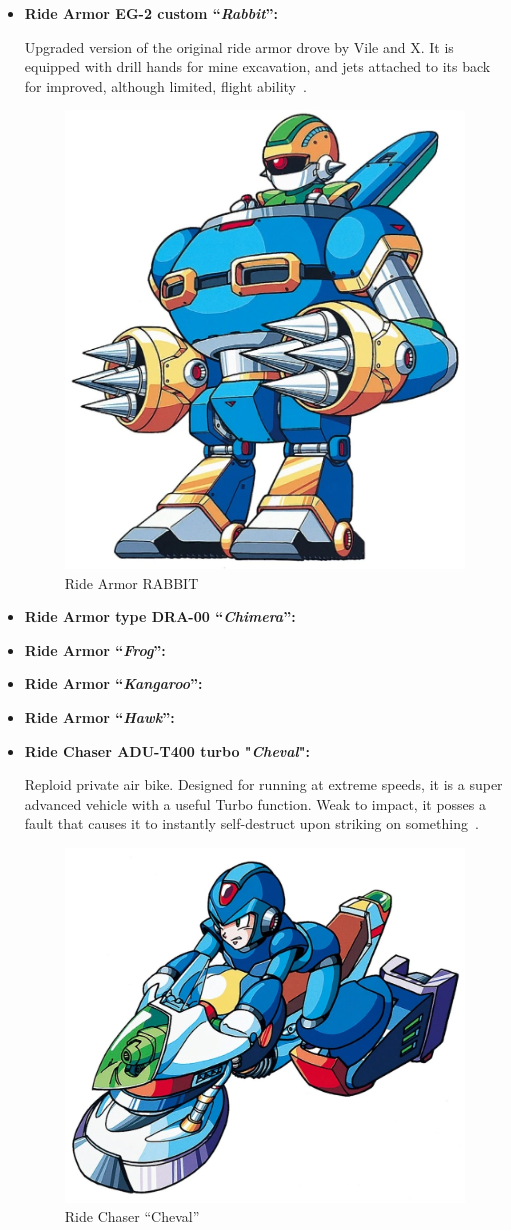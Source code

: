 \begin{itemize}
	\item \hypertarget{vehicle:Ride_Armor_Rabbit}{\textbf{Ride Armor EG-2 custom ``\textit{Rabbit}'':}}
	Upgraded version of the original ride armor drove by Vile and X. It is  equipped with drill hands for mine excavation, and jets attached to its back for improved, although limited, flight ability~\cite{wayback:X2_resources}. 
	\begin{figure}[htp]
		\centering
		\includegraphics[width=0.4\linewidth]{figures/X2/Enemies/Ride_armor_RABBIT.png}
		\caption{Ride Armor RABBIT}
	\end{figure}
	
	\item \hypertarget{vehicle:Ride_Armor_Chimera}{\textbf{Ride Armor type DRA-00 ``\textit{Chimera}'':}}
	
	\item \hypertarget{vehicle:Ride_Armor_Frog}{\textbf{Ride Armor ``\textit{Frog}'':}}
	
	\item \hypertarget{vehicle:Ride_Armor_Kangaroo}{\textbf{Ride Armor ``\textit{Kangaroo}'':}}
	
	\item \hypertarget{vehicle:Ride_Armor_Hawk}{\textbf{Ride Armor ``\textit{Hawk}'':}}
	
	\item \hypertarget{vehicle:Ride_Chaser_Cheval}{\textbf{Ride Chaser ADU-T400 turbo "\textit{Cheval}": }}
	Reploid private air bike. Designed for running at extreme speeds, 
	it is a super advanced vehicle with a useful Turbo function. Weak to impact, it posses  a fault that causes it to instantly self-destruct upon striking on something~\cite{wayback:X2_resources}.
	\begin{figure}[htp]
		\centering
		\includegraphics[width=0.4\linewidth]{figures/X2/weapons/RCCheval.png}
		\caption{Ride Chaser ``Cheval''}
	\end{figure}
	
	
	
	
\end{itemize}


